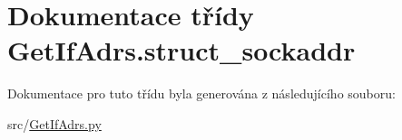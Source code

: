 \hypertarget{classGetIfAdrs_1_1struct__sockaddr}{\section{Dokumentace třídy Get\-If\-Adrs.\-struct\-\_\-sockaddr}
\label{d6/dba/classGetIfAdrs_1_1struct__sockaddr}
}


Dokumentace pro tuto třídu byla generována z následujícího souboru\-:\begin{DoxyCompactItemize}
\item 
src/\hyperlink{GetIfAdrs_8py}{Get\-If\-Adrs.\-py}\end{DoxyCompactItemize}
